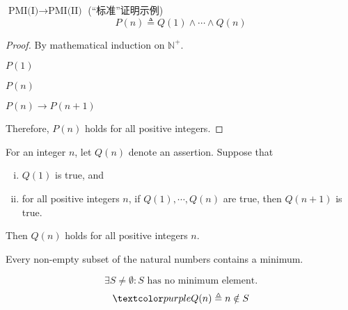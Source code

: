 \begin{frame}{}
  \begin{exampleblock}{$\text{PMI(I)} \to \text{PMI(II)}$ (``标准''证明示例)}
    \[
      P(n) \triangleq Q(1) \land \cdots \land Q(n)
    \]

  \end{exampleblock}

  \vspace{0.60cm}
  \pause
  \begin{proof}
    By mathematical induction on $\mathbb{N}^{+}$.

    \begin{description}
      \item[Basis Step:] $P(1)$
      \item[\textcolor{cyan}{Inductive Hypothesis:}] $P(n)$
      \item[Inductive Step:] $P(n) \to P(n+1)$
    \end{description}

    Therefore, $P(n)$ holds for all positive integers.
  \end{proof}
\end{frame}

\begin{frame}{}
  \begin{theorem}
    For an integer $n$, let $Q(n)$ denote an assertion. Suppose that
    \begin{enumerate}[(i)]
      \item $Q(1)$ is true, and
      \item for all positive integers $n$, if $Q(1), \cdots, Q(n)$ are true,
	then $Q(n+1)$ is true.
    \end{enumerate}
    Then $Q(n)$ holds for all positive integers $n$.
  \end{theorem}

  \begin{theorem}
    Every non-empty subset of the natural numbers contains a minimum.
  \end{theorem}

  \pause
  \begin{center}
    \[
      \exists S \neq \emptyset: S \text{ has no minimum element.}
    \]
    \pause
    \vspace{-0.30cm}
    \[
      \purple{Q(n) \triangleq n \notin S}
    \]
  \end{center}
\end{frame}
